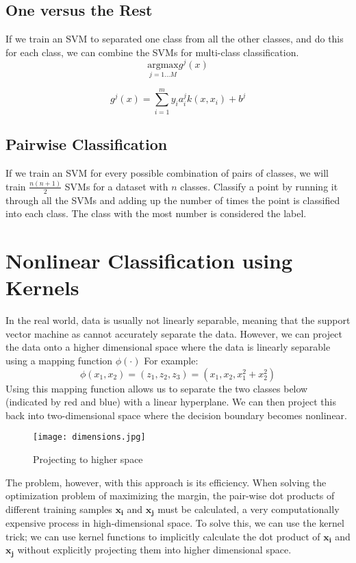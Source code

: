\documentclass{article}
\begin{document}
\subsection{One versus the Rest}
If we train an SVM to separated one class from all the other classes, and do this for each class, we can combine the SVMs for multi-class classification.
$$\mbox{argmax}\limits_{j=1 \dots M} g^j(x)$$

\[g^j(x) = \sum_{i=1}^{m}y_i a_{i}^j k(x, x_i) + b^j\]

\subsection{Pairwise Classification}
If we train an SVM for every possible combination of pairs of classes, we will train $\frac{n(n+1)}{2}$ SVMs for a dataset with $n$ classes. Classify a point by running it through all the SVMs and adding up the number of times the point is classified into each class. The class with the most number is considered the label.


\section{Nonlinear Classification using Kernels}
In the real world, data is usually not linearly separable, meaning that the support vector machine as cannot accurately separate the data. However, we can project the data onto a higher dimensional space where the data is linearly separable using a mapping function $\phi{(\cdot)}$ For example:
\[ \phi{(x_1, x_2)} = (z_1, z_2, z_3) = (x_1, x_2, x_1^2 + x_2^2) \]
Using this mapping function allows us to separate the two classes below (indicated by red and blue) with a linear hyperplane. We can then project this back into two-dimensional space where the decision boundary becomes nonlinear.

\begin{figure}[h!]
\centering
\texttt{[image: dimensions.jpg]}
\caption{Projecting to higher space}
\label{fig:mapping}
\end{figure}
The problem, however, with this approach is its efficiency. When solving the optimization problem of maximizing the margin, the pair-wise dot products of different training samples $\bm{x_i}$ and $\bm{x_j}$ must be calculated, a very computationally expensive process in high-dimensional space. To solve this, we can use the kernel trick; we can use kernel functions to implicitly calculate the dot product of $\bm{x_i}$ and $\bm{x_j}$ without explicitly projecting them into higher dimensional space. 
\end{document}
